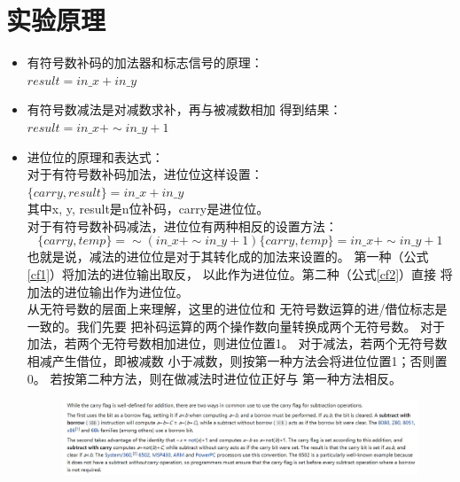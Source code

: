 \documentclass[12pt,a4paper,UTF8]{article}
\begin{document}
\section{实验原理}
\begin{itemize}
  \item 有符号数补码的加法器和标志信号的原理：\\
        $result = in\_x + in\_y$
  \item 有符号数减法是对减数求补，再与被减数相加
        得到结果：\\ $result = in\_x + \sim in\_y + 1$

  \item 进位位的原理和表达式： \\
        对于有符号数补码加法，进位位这样设置：\\
        $\{carry, result\} = in\_x + in\_y$ \\
        其中x, y, result是n位补码，carry是进位位。 \\
        对于有符号数补码减法，进位位有两种相反的设置方法：\\
        \begin{subequations}
          \begin{equation}
            \{carry, temp\} = \sim(in\_x + \sim in\_y + 1)
            \label{cf1}
          \end{equation}
          \begin{equation}
            \{carry, temp\} = in\_x + \sim in\_y + 1
            \label{cf2}
          \end{equation}
        \end{subequations}
        也就是说，减法的进位位是对于其转化成的加法来设置的。
        第一种（公式\eqref{cf1}）将加法的进位输出取反，
        以此作为进位位。第二种（公式\eqref{cf2}）直接
        将加法的进位输出作为进位位。 \\
        从无符号数的层面上来理解，这里的进位位和
        无符号数运算的进/借位标志是一致的。我们先要
        把补码运算的两个操作数向量转换成两个无符号数。
        对于加法，若两个无符号数相加进位，则进位位置1。
        对于减法，若两个无符号数相减产生借位，即被减数
        小于减数，则按第一种方法会将进位位置1；否则置0。
        若按第二种方法，则在做减法时进位位正好与
        第一种方法相反。 \\
        \begin{figure}[H]
          \centering
          \includegraphics[width=1\textwidth]{cf_def.JPG}

\end{figure}
\end{itemize}
\end{document}

